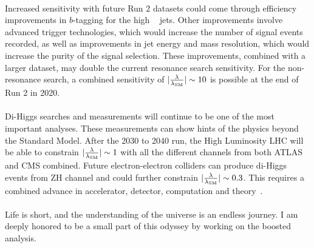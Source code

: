 \paragraph{}
Increased sensitivity with future Run 2 datasets could come through efficiency improvements in $b$-tagging for the high \pt~ jets.
Other improvements involve advanced trigger technologies, which would increase the number of signal events recorded, as well as improvements in jet energy and mass resolution, which would increase the purity of the signal selection.
These improvements, combined with a larger dataset, may double the current resonance search sensitivity. 
For the non-resonance search, a combined sensitivity of $|\frac{\rm\lambda}{\rm\lambda_{SM}}| \sim 10$ is possible at the end of Run 2 in 2020.

\paragraph{}
Di-Higgs searches and measurements will continue to be one of the most important analyses. 
These measurements can show hints of the physics beyond the Standard Model. 
After the 2030 to 2040 run, the High Luminosity LHC will be able to constrain $|\frac{\rm\lambda}{\rm\lambda_{SM}}| \sim 1$ with all the different channels from both ATLAS and CMS combined.
Future electron-electron colliders can produce di-Higgs events from ZH channel and could further constrain $|\frac{\rm\lambda}{\rm\lambda_{SM}}| \sim 0.3$.
This requires a combined advance in accelerator, detector, computation and theory~\cite{Richter:2014pga, Hawking:2018tcn}.

\paragraph{}
Life is short, and the understanding of the universe is an endless journey. 
I am deeply honored to be a small part of this odyssey by working on the boosted \pptofourb~ analysis.
